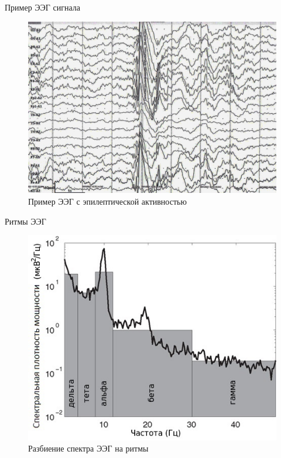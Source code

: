 \documentclass[10pt, red]{beamer}
\begin{document}
\begin{frame}{Пример ЭЭГ сигнала}

\begin{figure}[h]
    \centering
    \includegraphics[width=1\linewidth]{src/ЭЭГ-с-эпилептической-активностью.jpg}
    \caption{Пример ЭЭГ с эпилептической активностью}
    \label{pic:epilepsy}
\end{figure}
    
\end{frame}

\begin{frame}{Ритмы ЭЭГ}

\begin{figure}[h]
    \centering
    \includegraphics[width=0.75\linewidth]{src/Спектр_ЭЭГ.jpg}
    \caption{Разбиение спектра ЭЭГ на ритмы}
    \label{pic:rhythms}
\end{figure}
    
\end{frame}
\end{document}

